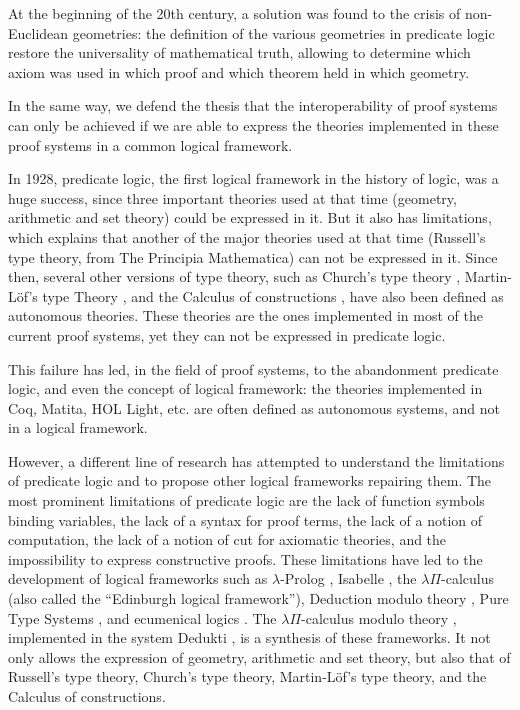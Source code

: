 At the beginning of the 20th century, a solution was found to
the crisis of non-Euclidean geometries: the definition of the various
geometries in predicate logic \cite{HilbertAckermann}
restore the universality of mathematical truth, allowing to determine
which axiom was used in which proof and which theorem held in
which geometry.

In the same way, we defend the thesis that the interoperability of
proof systems can only be achieved if we are able to express the theories
implemented in these proof systems in a common logical framework.

In 1928, predicate logic, the first logical framework in the history
of logic, was a huge success, since three important theories used at
that time (geometry, arithmetic and set theory) could be expressed in
it. But it also has limitations, which explains that another of the major
theories used at that time (Russell's type theory, from The Principia
Mathematica) can not be expressed in it. Since then, several other
versions of type theory, such as Church's type theory \cite{Church40},
Martin-L\"of's type Theory \cite{Martin-Lof84}, and the Calculus of
constructions \cite{CoquandHuet88}, have also been defined as
autonomous theories. These theories are the ones implemented
in most of the current proof systems, yet they can not be expressed
in predicate logic.

This failure has led, in the field of proof systems, to the abandonment
predicate logic, and even the concept of logical framework: the
theories implemented in {\sc Coq}, {\sc Matita}, {\sc HOL Light},
etc. are often defined as autonomous systems, and not in a logical
framework.

However, a different line of research has attempted to understand the
limitations of predicate logic and to propose other logical frameworks
repairing them. The most prominent limitations of predicate logic are
the lack of function symbols binding variables, the lack of a syntax
for proof terms, the lack of a notion of computation, the lack of a
notion of cut for axiomatic theories, and the impossibility to express
constructive proofs. These limitations have led to the development of
logical frameworks such as $\lambda$-Prolog \cite{NadathurMiller88,
  MillerNadathur12}, Isabelle \cite{Paulson90}, the $\lambda
\Pi$-calculus \cite{HarperHonsellPlotkin91} (also called the
``Edinburgh logical framework''), Deduction modulo theory
\cite{DowekHardinKirchner03, DowekWerner03}, Pure Type Systems
\cite{Berardi88,Terlouw89}, and ecumenical logics
\cite{Prawitz15,Dowek15,PereiraRodriguez17}. The $\lambda
\Pi$-calculus modulo theory \cite{CousineauDowek07}, implemented in
the system {\sc Dedukti} \cite{Assaf16}, is a synthesis of these
frameworks. It not only allows the expression of geometry, arithmetic
and set theory, but also that of Russell's type theory, Church's type
theory, Martin-L\"of's type theory, and the Calculus of constructions.

